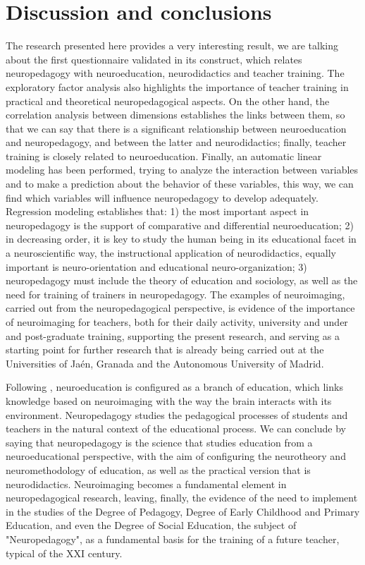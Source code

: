 \documentclass[english]{textolivre}
\begin{document}
\section{Discussion and conclusions}\label{sec-modelo}
The research presented here provides a very interesting result, we are talking about the first questionnaire validated in its construct, which relates neuropedagogy with neuroeducation, neurodidactics and teacher training. The exploratory factor analysis also highlights the importance of teacher training in practical and theoretical neuropedagogical aspects. On the other hand, the correlation analysis between dimensions establishes the links between them, so that we can say that there is a significant relationship between neuroeducation and neuropedagogy, and between the latter and neurodidactics; finally, teacher training is closely related to neuroeducation. Finally, an automatic linear modeling has been performed, trying to analyze the interaction between variables and to make a prediction about the behavior of these variables, this way, we can find which variables will influence neuropedagogy to develop adequately. Regression modeling establishes that: 1) the most important aspect in neuropedagogy is the support of comparative and differential neuroeducation; 2) in decreasing order, it is key to study the human being in its educational facet in a neuroscientific way, the instructional application of neurodidactics, equally important is neuro-orientation and educational neuro-organization; 3) neuropedagogy must include the theory of education and sociology, as well as the need for training of trainers in neuropedagogy. The examples of neuroimaging, carried out from the neuropedagogical perspective, is evidence of the importance of neuroimaging for teachers, both for their daily activity, university and under and post-graduate training, supporting the present research, and serving as a starting point for further research that is already being carried out at the Universities of Jaén, Granada and the Autonomous University of Madrid.

Following \textcite{bejar_neuroeducacion_2014}, neuroeducation is configured as a branch of education, which links knowledge based on neuroimaging with the way the brain interacts with its environment. Neuropedagogy studies the pedagogical processes of students and teachers in the natural context of the educational process. We can conclude by saying that neuropedagogy is the science that studies education from a neuroeducational perspective, with the aim of configuring the neurotheory and neuromethodology of education, as well as the practical version that is neurodidactics. Neuroimaging becomes a fundamental element in neuropedagogical research, leaving, finally, the evidence of the need to implement in the studies of the Degree of Pedagogy, Degree of Early Childhood and Primary Education, and even the Degree of Social Education, the subject of "Neuropedagogy", as a fundamental basis for the training of a future teacher, typical of the XXI century.
\end{document}
